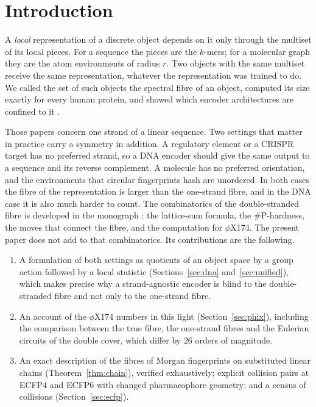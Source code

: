 \documentclass[11pt]{article}
\theoremstyle{plain}
\theoremstyle{definition}
\theoremstyle{remark}
\begin{document}
\section{Introduction}\label{sec:intro}

A \emph{local} representation of a discrete object depends on it only through the multiset of its local
pieces. For a sequence the pieces are the $k$-mers; for a molecular graph they are the atom environments of
radius $r$. Two objects with the same multiset receive the same representation, whatever the representation
was trained to do. We called the set of such objects the spectral fibre of an object, computed its size exactly
for every human protein, and showed which encoder architectures are confined to it
\cite{CC26a,CC26b,CC26c,CC26d}.

Those papers concern one strand of a linear sequence. Two settings that matter in practice carry a symmetry
in addition. A regulatory element or a CRISPR target has no preferred strand, so a DNA encoder should give the
same output to a sequence and its reverse complement. A molecule has no preferred orientation, and the
environments that circular fingerprints hash are unordered. In both cases the fibre of the representation is
larger than the one-strand fibre, and in the DNA case it is also much harder to count. The combinatorics of
the double-stranded fibre is developed in the monograph \cite{AG}: the lattice-sum formula, the $\#$P-hardness,
the moves that connect the fibre, and the computation for $\phi$X174. The present paper does not add to that
combinatorics. Its contributions are the following.
\begin{enumerate}
\item A formulation of both settings as quotients of an object space by a group action followed by a local
statistic (Sections~\ref{sec:dna} and~\ref{sec:unified}), which makes precise why a strand-agnostic encoder is
blind to the double-stranded fibre and not only to the one-strand fibre.
\item An account of the $\phi$X174 numbers in this light (Section~\ref{sec:phix}), including the comparison
between the true fibre, the one-strand fibres and the Eulerian circuits of the double cover, which differ by
$26$ orders of magnitude.
\item An exact description of the fibres of Morgan fingerprints on substituted linear chains
(Theorem~\ref{thm:chain}), verified exhaustively; explicit collision pairs at ECFP4 and ECFP6 with changed
pharmacophore geometry; and a census of collisions (Section~\ref{sec:ecfp}).
\end{enumerate}
\end{document}
